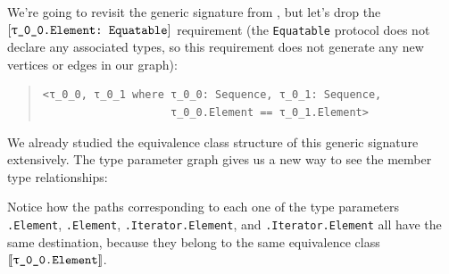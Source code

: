 \documentclass[../generics]{subfiles}
\begin{document}
\begin{example}\label{two sequence same element example} We're going to revisit the generic signature from , but let's drop the $\ConfReq{\rT.Element}{Equatable}$ requirement (the \texttt{Equatable} protocol does not declare any associated types, so this requirement does not generate any new vertices or edges in our graph):
\begin{quote}
\begin{verbatim}
<τ_0_0, τ_0_1 where τ_0_0: Sequence, τ_0_1: Sequence,
                    τ_0_0.Element == τ_0_1.Element>
\end{verbatim}
\end{quote}
We already studied the equivalence class structure of this generic signature extensively. The type parameter graph gives us a new way to see the member type relationships:
\begin{center}
\end{center}
Notice how the paths corresponding to each one of the type parameters \texttt{\rT.Element}, \texttt{\rU.Element}, \texttt{\rT.Iterator.Element}, and \texttt{\rU.Iterator.Element} all have the same destination, because they belong to the same equivalence class $\archetype{\rT.Element}$.
\end{example}
\end{document}

